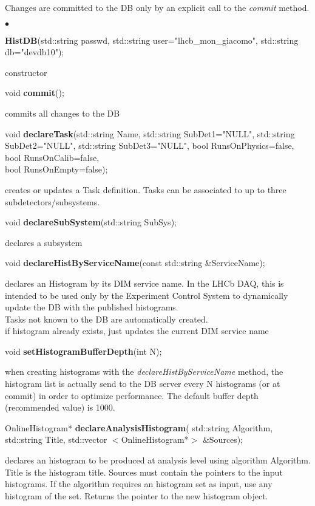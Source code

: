\documentclass{lhcbnote}
\begin{document}
Changes are committed to the DB only by an explicit call to the {\it
commit} method.

\begin{list}{$\bullet$}{}
\item {\bf HistDB}(std::string passwd, 
		std::string user="lhcb\_mon\_giacomo", 
		std::string db="devdb10");

constructor

\item void {\bf commit}();

commits all changes to the DB


\item void {\bf declareTask}(std::string Name, 
		   std::string SubDet1="NULL", 
		   std::string SubDet2="NULL", 
		   std::string SubDet3="NULL",
		   bool RunsOnPhysics=false, 
		   bool RunsOnCalib=false,\\ 
		   bool RunsOnEmpty=false);

creates or updates a Task definition. Tasks can be associated to up to
three subdetectors/subsystems. 


\item   void {\bf declareSubSystem}(std::string SubSys);

declares a  subsystem

\item   void {\bf declareHistByServiceName}(const std::string \&ServiceName);

declares an Histogram by its DIM service name. In the LHCb
DAQ, this is intended to be used only by the Experiment Control
System to dynamically update the DB with the published histograms.\\
Tasks not known to the DB are automatically created.\\
if histogram already exists, just updates the current DIM service name 

\item void {\bf setHistogramBufferDepth}(int N);

when creating histograms with the {\it declareHistByServiceName}
method, the histogram list is actually send to the DB server every N
histograms (or at commit) in order to optimize performance. The
default buffer depth (recommended value) is 1000.  

\item OnlineHistogram* {\bf declareAnalysisHistogram}( std::string 
Algorithm, std::string Title, std::vector $<$OnlineHistogram*$>$ \&Sources);

declares an histogram to be produced at analysis
level using algorithm Algorithm. Title is the histogram title. Sources
must contain the pointers to the input histograms. If the algorithm
requires an histogram set as input, use any histogram of the
set. Returns the pointer to the new histogram object.
 

\end{list}
\end{document}

